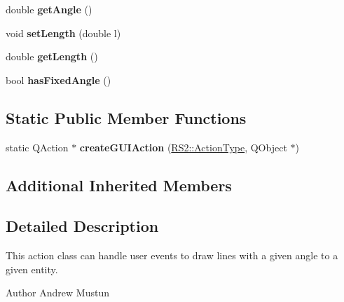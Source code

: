 \begin{DoxyCompactItemize}
\item 
\hypertarget{classRS__ActionDrawLineRelAngle_ae1aa3ad6c1adefee9a2177947f8e81f6}{double {\bfseries get\-Angle} ()}\label{classRS__ActionDrawLineRelAngle_ae1aa3ad6c1adefee9a2177947f8e81f6}

\item 
\hypertarget{classRS__ActionDrawLineRelAngle_afc2a04db768f4a986b639ef06a071175}{void {\bfseries set\-Length} (double l)}\label{classRS__ActionDrawLineRelAngle_afc2a04db768f4a986b639ef06a071175}

\item 
\hypertarget{classRS__ActionDrawLineRelAngle_a438668d4b35994203ee09abe16c663ce}{double {\bfseries get\-Length} ()}\label{classRS__ActionDrawLineRelAngle_a438668d4b35994203ee09abe16c663ce}

\item 
\hypertarget{classRS__ActionDrawLineRelAngle_a5f3940fd9f765b76e2c78280c10d8abc}{bool {\bfseries has\-Fixed\-Angle} ()}\label{classRS__ActionDrawLineRelAngle_a5f3940fd9f765b76e2c78280c10d8abc}

\end{DoxyCompactItemize}
\subsection*{Static Public Member Functions}
\begin{DoxyCompactItemize}
\item 
\hypertarget{classRS__ActionDrawLineRelAngle_aaaa401e5bf29d185947cdee25675ecd9}{static Q\-Action $\ast$ {\bfseries create\-G\-U\-I\-Action} (\hyperlink{classRS2_afe3523e0bc41fd637b892321cfc4b9d7}{R\-S2\-::\-Action\-Type}, Q\-Object $\ast$)}\label{classRS__ActionDrawLineRelAngle_aaaa401e5bf29d185947cdee25675ecd9}

\end{DoxyCompactItemize}
\subsection*{Additional Inherited Members}


\subsection{Detailed Description}
This action class can handle user events to draw lines with a given angle to a given entity.

\begin{DoxyAuthor}{Author}
Andrew Mustun 
\end{DoxyAuthor}


